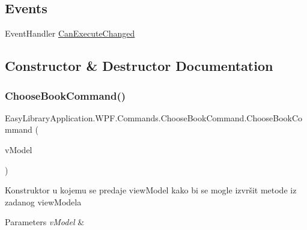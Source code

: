 \subsection*{Events}
\begin{DoxyCompactItemize}
\item 
Event\+Handler \mbox{\hyperlink{class_easy_library_application_1_1_w_p_f_1_1_commands_1_1_choose_book_command_a4fdf15ea76f569757c64ad7e75dd909f}{Can\+Execute\+Changed}}
\end{DoxyCompactItemize}


\subsection{Constructor \& Destructor Documentation}
\mbox{\label{class_easy_library_application_1_1_w_p_f_1_1_commands_1_1_choose_book_command_a50f49dceebfda770c19f41204a7f9fab}} 
\subsubsection{\texorpdfstring{Choose\+Book\+Command()}{ChooseBookCommand()}}
{\footnotesize\ttfamily Easy\+Library\+Application.\+W\+P\+F.\+Commands.\+Choose\+Book\+Command.\+Choose\+Book\+Command (\begin{DoxyParamCaption}\item[{\mbox{\hyperlink{class_easy_library_application_1_1_w_p_f_1_1_view_model_1_1_user_books_view_model}{User\+Books\+View\+Model}}}]{v\+Model }\end{DoxyParamCaption})}



Konstruktor u kojemu se predaje view\+Model kako bi se mogle izvršit metode iz zadanog view\+Modela 


\begin{DoxyParams}{Parameters}
{\em v\+Model} & \\
\hline
\end{DoxyParams}


